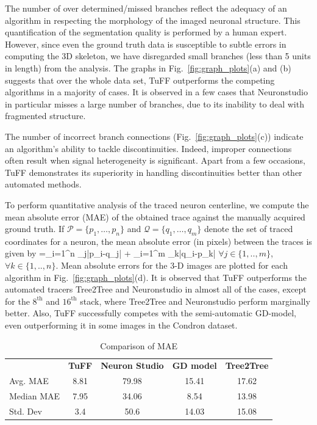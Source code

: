 The number of over determined/missed branches reflect the adequacy of an algorithm in respecting the morphology of the imaged neuronal structure. This quantification of the segmentation quality is performed by a human expert. However, since even the ground truth data is susceptible to subtle errors in computing the 3D skeleton, we have disregarded small branches (less than 5 units in length) from the analysis. The graphs in Fig.~\ref{fig:graph_plots}(a) and (b) suggests that over the whole data set, TuFF outperforms the competing algorithms in a majority of cases. It is observed in a few cases that Neuronstudio in particular misses a large number of branches, due to its inability to deal with fragmented structure.



The number of incorrect branch connections (Fig.~\ref{fig:graph_plots}(c)) indicate an algorithm's ability to tackle discontinuities. Indeed, improper connections often result when signal heterogeneity is significant. Apart from a few occasions, TuFF demonstrates its superiority in handling discontinuities better than other automated methods.    

To perform quantitative analysis of the traced neuron centerline, we compute the mean absolute error (MAE) of the obtained trace against the manually acquired ground truth. If $\mathcal{P}=\{p_1,\ldots,p_n\}$ and $\mathcal{Q}=\{q_1,\ldots,q_m\}$ denote the set of traced coordinates for a neuron, the mean absolute error (in pixels) between the traces is given by
\bea
{}=\sum_{i=1}^{n} \min_j|p_i-q_j| +
             \sum_{i=1}^{m} \min_k|q_i-p_k| 
\label{eq:MEA}
\eea
$\forall j\in\{1,..,m\}$, $\forall k\in\{1,..,n\}$. Mean absolute errors for the 3-D images are plotted for each algorithm in Fig.~\ref{fig:graph_plots}(d). It is observed that TuFF outperforms the automated tracers Tree2Tree and Neuronstudio in almost all of the cases, except for the $8^{\text{th}}$ and $16^{\text{th}}$ stack, where Tree2Tree and Neuronstudio perform marginally better. Also, TuFF successfully competes with the semi-automatic GD-model, even outperforming it in some images in the Condron dataset. 
\begin{table}[b]
    	\caption[Quantitative analysis of TuFF]{Comparison of MAE}
	\centering
    \begin{tabular}{lcccc}
    ~               & \textbf{TuFF} & \textbf{Neuron Studio} &\textbf{ GD model} & \textbf{Tree2Tree} \\ 
    Avg. MAE    & 8.81 & 79.98         & 15.41     & 17.62      \\
    Median MAE  & 7.95 & 34.06          & 8.54     & 13.98      \\
    Std. Dev        & 3.4 & 50.6          & 14.03     & 15.08      \\ 
    \end{tabular}
\label{table:quant_compare}
\end{table}

